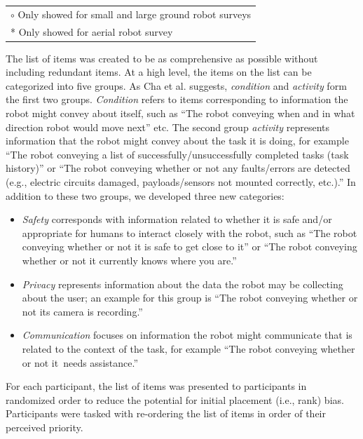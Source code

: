 \documentclass[letterpaper, 10 pt, conference]{ieeeconf}  %
\begin{document}
\begin {table}
\begin{center}
\begin{tabular}{|p{8pt} | p{215.6pt} |}
\end{tabular}
\begin{tabular}{|p{236pt}|}
 $\circ$ Only showed for small and large ground robot surveys\\
 * Only showed for aerial robot survey\\
\hline
\end{tabular}

\end{center}
\end{table}
    
The list of items was created to be as comprehensive as possible without including redundant items. At a high level, the items on the list can be categorized into five groups. As Cha et al. \cite{cha2018survey} suggests, \textit{condition} and \textit{activity} form the first two groups. \textit{Condition} refers to items corresponding to information the robot might convey about itself, such as ``The robot conveying when and in what direction robot would move next'' etc. The second group \textit{activity} represents information that the robot might convey about the task it is doing, for example ``The robot conveying a list of successfully/unsuccessfully completed tasks (task history)'' or ``The robot conveying whether or not any faults/errors are detected (e.g., electric circuits damaged, payloads/sensors not mounted correctly, etc.).'' In addition to these two groups, we developed three new categories: 
\begin{itemize}
    \item \textit{Safety} corresponds with information related to whether it is safe and/or appropriate for humans to interact closely with the robot, such as ``The robot conveying whether or not it is safe to get close to it'' or ``The robot conveying whether or not it currently knows where you are.''
    
    \item \textit{Privacy} represents information about the data the robot may be collecting about the user; an example for this group is ``The robot conveying whether or not its camera is recording.''
    
    \item \textit{Communication} focuses on information the robot might communicate that is related to the context of the task, for example ``The robot conveying whether or not it needs assistance.''
    
\end{itemize}  

For each participant, the list of items was presented to participants in randomized order to reduce the potential for initial placement (i.e., rank) bias. Participants were tasked with re-ordering the list of items in order of their perceived priority.  
    
\end{document}

